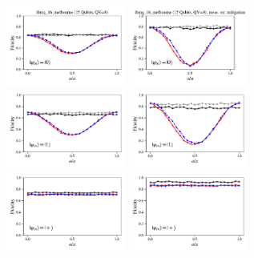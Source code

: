 \documentclass[a4paper]{article}
\begin{document}
\begin{figure}[H]
	\centering
	\includegraphics[width=0.35\textwidth]{fidelity_qc4_mit1_state0}
	\includegraphics[width=0.35\textwidth]{fidelity_qc4_mit0_state0}
	\\
	\includegraphics[width=0.35\textwidth]{fidelity_qc4_mit1_state1}
	\includegraphics[width=0.35\textwidth]{fidelity_qc4_mit0_state1}
	\\
	\includegraphics[width=0.35\textwidth]{fidelity_qc4_mit1_state2}
	\includegraphics[width=0.35\textwidth]{fidelity_qc4_mit0_state2}

\end{figure}
\end{document}
